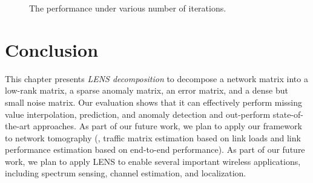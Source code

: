 \begin{figure}[h!]
  \caption{The performance under various number of iterations.}
  \label{fig:convengence}
\end{figure}



\section{Conclusion}
\label{sec:conclusion}

This chapter presents {\em LENS decomposition} to decompose a network
matrix into a low-rank matrix, a sparse
anomaly matrix, an error matrix, and a dense but small noise matrix. Our
evaluation shows that it can effectively perform missing value
interpolation, prediction, and anomaly detection and out-perform
state-of-the-art approaches. As part of our future work, we plan to
apply our framework to network tomography (\eg, traffic matrix
estimation based on link loads and link performance estimation based
on end-to-end performance). As part of our future work, we plan to
apply LENS to enable several important wireless applications,
including spectrum sensing, channel estimation, and localization.

